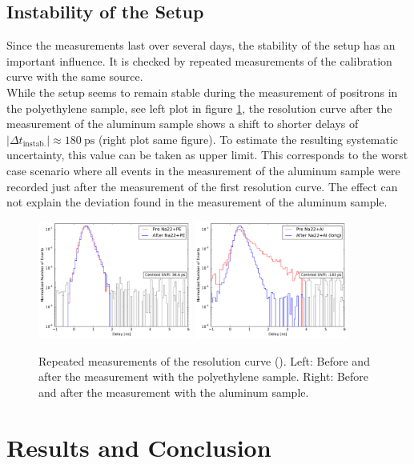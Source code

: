 \documentclass[
	paper=A4,
	parskip=full,
	chapterprefix=true,
	11pt,
	headings=normal,
	bibliography=totoc,
	listof=totoc,
	titlepage=on,
]{scrreprt}
\begin{document}
\section{Instability of the Setup}
Since the measurements last over several days, the stability of the setup has an important influence. It is checked by repeated measurements of the calibration curve with the same  source.\\
While the setup seems to remain stable during the measurement of positrons in the polyethylene sample, see left plot in figure \ref{fig:instability}, the resolution curve after the measurement of the aluminum sample shows a shift to shorter delays of $|\Delta t_\textrm{instab.} | \approx \SI{180}{\pico\second}$ (right plot same figure). To estimate the resulting systematic uncertainty, this value can be taken as upper limit. This corresponds to the worst case scenario where all events in the measurement of the aluminum sample were recorded just after the measurement of the first resolution curve. The effect can not explain the deviation found in the measurement of the aluminum sample.
\begin{figure}
	\centering
	\includegraphics[width=0.45\textwidth]{all_cobalt_1}
	\includegraphics[width=0.45\textwidth]{all_cobalt_0}
	\caption{Repeated measurements of the resolution curve (). Left: Before and after the measurement with the polyethylene sample. Right: Before and after the measurement with the aluminum sample.}
	\label{fig:instability}
\end{figure}

\chapter{Results and Conclusion}


\cleardoublepage


{}
\end{document}
